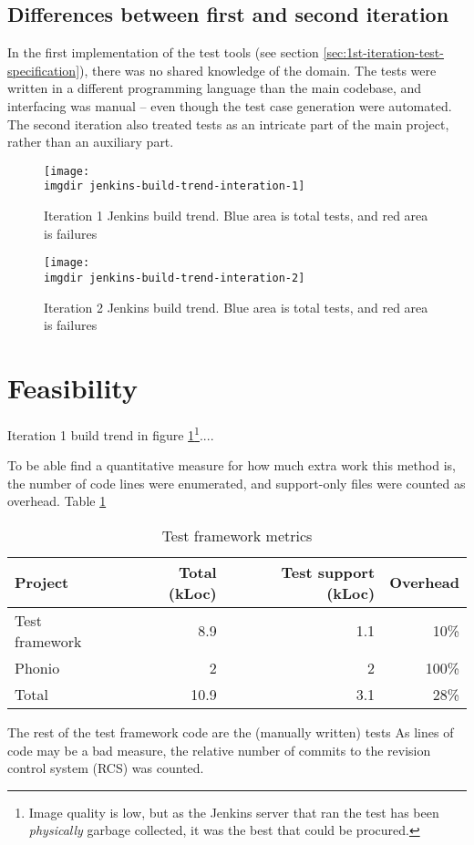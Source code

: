 \subsection{Differences between first and second iteration}
In the first implementation of the test tools (see section \ref{sec:1st-iteration-test-specification}), there was no shared knowledge of the domain. The tests were written in a different programming language than the main codebase, and interfacing was manual -- even though the test case generation were automated.
The second iteration also treated tests as an intricate part of the main project, rather than an auxiliary part.
\begin{figure}[!hbpt]
\centering
\texttt{[image: \\imgdir jenkins-build-trend-interation-1]}
\caption{Iteration 1 Jenkins build trend. Blue area is total tests, and red area is failures}
\label{fig:jenkins-build-trend-interation-1}
\end{figure}


\begin{figure}[!hbpt]
\centering
\texttt{[image: \\imgdir jenkins-build-trend-interation-2]}
\caption{Iteration 2 Jenkins build trend. Blue area is total tests, and red area is failures}
\label{fig:jenkins-build-trend-interation-2}
\end{figure}

\section{Feasibility}
Iteration 1 build trend in figure \ref{fig:jenkins-build-trend-interation-1}\footnote{Image quality is low, but as the Jenkins server that ran the test has been \emph{physically} garbage collected, it was the best that could be procured.}....

To be able find a quantitative measure for how much extra work this method is, the number of code lines were enumerated, and support-only files were counted as overhead. Table \ref{tab:loc-metrics}
\begin{table}[!htbp]
\begin{tabular}{ | l | r | r | r |}
   \hline
   Project        & Total (kLoc) & Test support (kLoc) & Overhead \\ \hline
   Test framework & 8.9          & 1.1                 & 10\%     \\
   Phonio         & 2            & 2                   & 100\%    \\
   \hline
   \hline
   Total          & 10.9         & 3.1                 & 28\%     \\
   \hline
\end{tabular}
\caption{Test framework metrics}
\label{tab:loc-metrics}
\end{table}
The rest of the test framework code are the (manually written) tests
As lines of code may be a bad measure\cite{fraser2013does}, the relative number of commits to the revision control system (RCS) was counted. 

